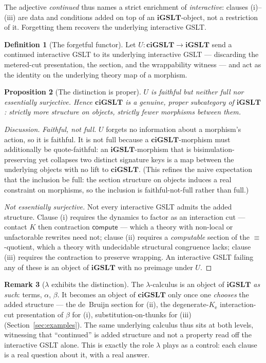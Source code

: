 \documentclass[11pt]{article}
\theoremstyle{definition}
\newtheorem{definition}{Definition}[section]
\newtheorem{remark}[definition]{Remark}
\theoremstyle{plain}
\newtheorem{proposition}[definition]{Proposition}
\newcommand{\iGSLT}{\mathbf{iGSLT}}
\newcommand{\ciGSLT}{\mathbf{ciGSLT}}
\newcommand{\Seq}{\equiv}
\newcommand{\compute}{\mathsf{compute}}
\newcommand{\Ke}{K_{\mathrm{e}}}
\begin{document}
The adjective \emph{continued} thus names a strict enrichment of
\emph{interactive}: clauses (i)--(iii) are data and conditions added on
top of an $\iGSLT$-object, not a restriction of it. Forgetting them
recovers the underlying interactive GSLT.

\begin{definition}[The forgetful functor]
\label{def:forget}
Let $U : \ciGSLT \to \iGSLT$ send a continued interactive GSLT to its
underlying interactive GSLT --- discarding the metered-cut presentation,
the section, and the wrappability witness --- and act as the identity on
the underlying theory map of a morphism.
\end{definition}

\begin{proposition}[The distinction is proper]
\label{prop:proper}
$U$ is faithful but neither full nor essentially surjective. Hence
$\ciGSLT$ is a genuine, proper subcategory of $\iGSLT$: strictly more
structure on objects, strictly fewer morphisms between them.
\end{proposition}

\begin{proof}[Discussion]
\emph{Faithful, not full.} $U$ forgets no information about a morphism's
action, so it is faithful. It is not full because a $\ciGSLT$-morphism
must additionally be quote-faithful: an $\iGSLT$-morphism that is
bisimulation-preserving yet collapses two distinct signature keys is a
map between the underlying objects with no lift to $\ciGSLT$. (This
refines the naive expectation that the inclusion be full: the section
structure on objects induces a real constraint on morphisms, so the
inclusion is faithful-not-full rather than full.)

\emph{Not essentially surjective.} Not every interactive GSLT admits the
added structure. Clause (i) requires the dynamics to factor as an
interaction cut --- contact $K$ then contraction $\compute$ --- which a
theory with non-local or unfactorable rewrites need not; clause (ii)
requires a \emph{computable} section of the $\Seq$-quotient, which a
theory with undecidable structural congruence lacks; clause (iii)
requires the contraction to preserve wrapping. An interactive GSLT
failing any of these is an object of $\iGSLT$ with no preimage under
$U$.
\end{proof}

\begin{remark}[$\lambda$ exhibits the distinction]
\label{rem:lambda-distinction}
The $\lambda$-calculus is an object of $\iGSLT$ \emph{as such}: terms,
$\alpha$, $\beta$. It becomes an object of $\ciGSLT$ only once one
\emph{chooses} the added structure --- the de~Bruijn section for (ii),
the degenerate-$\Ke$ interaction-cut presentation of $\beta$ for (i),
substitution-on-thunks for (iii) (Section~\ref{sec:examples}). The same
underlying calculus thus sits at both levels, witnessing that
``continued'' is added structure and not a property read off the
interactive GSLT alone. This is exactly the role $\lambda$ plays as a
control: each clause is a real question about it, with a real answer.
\end{remark}
\end{document}
